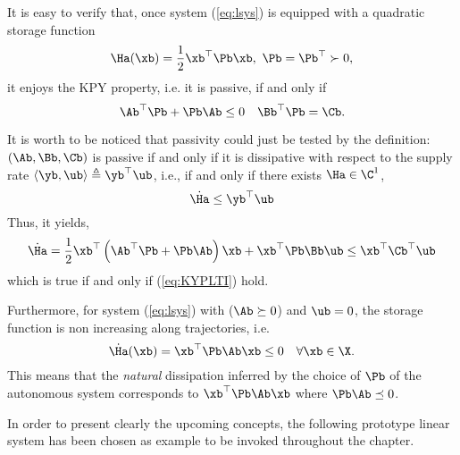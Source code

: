 %
{
It is easy to verify that, once system (\ref{eq:lsys}) is equipped with a quadratic storage function 
\begin{equation}
    \Ha(\xb) = \frac{1}{2}\xb^\top \Pb\xb,~\Pb = \Pb^\top \succ 0,
\end{equation}
it enjoys the KPY property, i.e. it is passive, if and only if
%
\begin{equation}\label{eq:KYPLTI}
        \Ab^\top \Pb + \Pb\Ab \leq 0\quad
        \Bb^\top \Pb = \Cb.
\end{equation}
%
\begin{rem}
    It is worth to be noticed that passivity could just be tested by the definition:
    $(\Ab,\Bb,\Cb)$ is passive if and only if it is dissipative with respect to the supply rate $\langle \yb,\ub \rangle\triangleq \yb^\top \ub$, i.e.,  if and only if there exists $\Ha\in\C^1$,
    \begin{equation}
        \dot{\Ha}\leq \yb^\top \ub
    \end{equation}
    Thus, it yields,
    \begin{align*}
        \dot{\Ha} =  \frac{1}{2}\xb^\top \left(\Ab^\top \Pb + \Pb\Ab\right)\xb + \xb^\top \Pb\Bb\ub \leq \xb^\top \Cb^\top \ub
    \end{align*}
    which is true if and only if (\ref{eq:KYPLTI}) hold.
\end{rem}
%
Furthermore, for system (\ref{eq:lsys}) with ($\Ab\succeq0$) and $\ub=0$, the storage function is non increasing along trajectories, i.e.
%
\begin{equation*}
    \dot{\Ha}(\xb) =  \xb^\top \Pb\Ab\xb \leq 0\quad\forall \xb\in\X.
\end{equation*}
%
This means that the \textit{natural} dissipation inferred by the choice of $\Pb$ of the autonomous system corresponds to $\xb^\top \Pb\Ab\xb$ where $\Pb\Ab\preceq0$. 

}
%
In order to present clearly the upcoming concepts, the following prototype linear system has been chosen as example to be invoked throughout the chapter.
%
